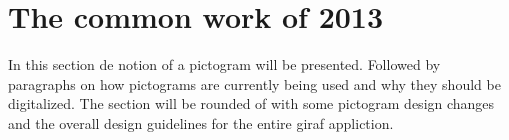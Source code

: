 ﻿\section{The common work of 2013}
In this section de notion of a pictogram will be presented. Followed by paragraphs on how pictograms are currently being used and why they should be digitalized. The section will be rounded of with some pictogram design changes and the overall design guidelines for the entire \ac{giraf} appliction.
